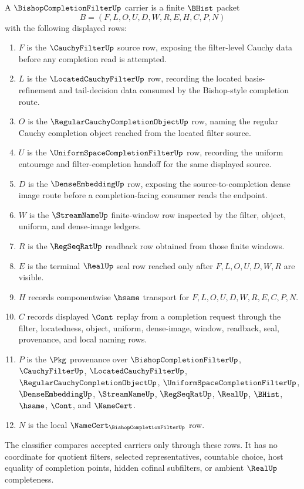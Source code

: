 \begin{definition}
\label{def:bishop-completion-filter-carrier}
A $\BishopCompletionFilterUp$ carrier is a finite $\BHist$ packet
$$
B=(F,L,O,U,D,W,R,E,H,C,P,N)
$$
with the following displayed rows:
\begin{enumerate}
\item $F$ is the $\CauchyFilterUp$ source row, exposing the filter-level Cauchy data before any completion read is attempted.
\item $L$ is the $\LocatedCauchyFilterUp$ row, recording the located basis-refinement and tail-decision data consumed by the Bishop-style completion route.
\item $O$ is the $\RegularCauchyCompletionObjectUp$ row, naming the regular Cauchy completion object reached from the located filter source.
\item $U$ is the $\UniformSpaceCompletionFilterUp$ row, recording the uniform entourage and filter-completion handoff for the same displayed source.
\item $D$ is the $\DenseEmbeddingUp$ row, exposing the source-to-completion dense image route before a completion-facing consumer reads the endpoint.
\item $W$ is the $\StreamNameUp$ finite-window row inspected by the filter, object, uniform, and dense-image ledgers.
\item $R$ is the $\RegSeqRatUp$ readback row obtained from those finite windows.
\item $E$ is the terminal $\RealUp$ seal row reached only after $F,L,O,U,D,W,R$ are visible.
\item $H$ records componentwise $\hsame$ transport for $F,L,O,U,D,W,R,E,C,P,N$.
\item $C$ records displayed $\Cont$ replay from a completion request through the filter, locatedness, object, uniform, dense-image, window, readback, seal, provenance, and local naming rows.
\item $P$ is the $\Pkg$ provenance over $\BishopCompletionFilterUp$, $\CauchyFilterUp$, $\LocatedCauchyFilterUp$, $\RegularCauchyCompletionObjectUp$, $\UniformSpaceCompletionFilterUp$, $\DenseEmbeddingUp$, $\StreamNameUp$, $\RegSeqRatUp$, $\RealUp$, $\BHist$, $\hsame$, $\Cont$, and $\NameCert$.
\item $N$ is the local $\NameCert_{\BishopCompletionFilterUp}$ row.
\end{enumerate}
The classifier compares accepted carriers only through these rows. It has no coordinate for quotient filters, selected representatives, countable choice, host equality of completion points, hidden cofinal subfilters, or ambient $\RealUp$ completeness.
\end{definition}

